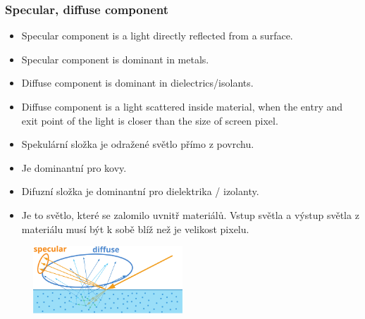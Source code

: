 \begin{frame}\frametitle{Specular, diffuse component}
  \scriptsize
  \begin{itemize}
    \item Specular component is a light directly reflected from a surface.
    \item Specular component is dominant in metals.
    \item Diffuse component is dominant in dielectrics/isolants.
    \item Diffuse component is a light scattered inside material, when the entry and exit point of the light is closer than the size of screen pixel.
  \end{itemize}
  \begin{itemize}
    \item Spekulární složka je odražené světlo přímo z povrchu.
    \item Je dominantní pro kovy.
    \item Difuzní složka je dominantní pro dielektrika / izolanty.
    \item Je to světlo, které se zalomilo uvnitř materiálů. Vstup světla a výstup světla z materiálu musí být k sobě blíž než je velikost pixelu.
  \end{itemize}
  \begin{figure}[ht]
  \includegraphics[width=0.5\textwidth]{pics/physicallyBasedRendering/specular_diffuse}
  \end{figure}
\end{frame}

